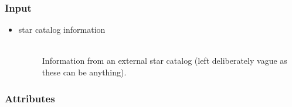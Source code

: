 \documentclass[cleanfoot]{asme2ej}
\begin{document}
\subsubsection*{Input}
\begin{itemize}
\item 
\begin{description}
    \item[star catalog information] \hfill \\
    Information from an external star catalog (left deliberately vague as these can be anything).
\end{description}
\end{itemize}

\subsubsection*{Attributes}
\end{document}
